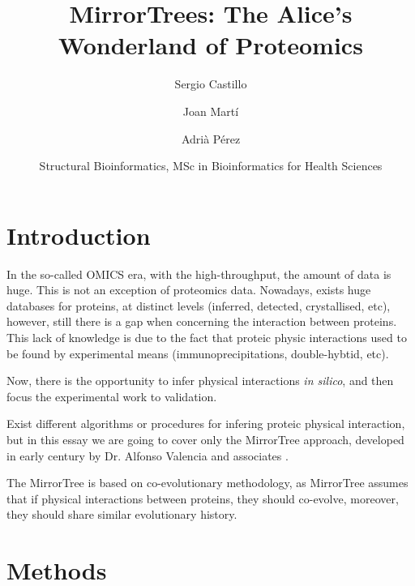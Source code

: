 \documentclass[11pt]{article}
\title{MirrorTrees: The Alice's Wonderland of Proteomics}
\author{
	Sergio Castillo
	\and
	Joan Martí
	\and
	Adrià Pérez
}
\date{Structural Bioinformatics, MSc in Bioinformatics for Health Sciences}
\begin{document}
\maketitle

\section{Introduction}
In the so-called OMICS era, with the high-throughput, the amount of data is huge. This is not an exception of proteomics data. Nowadays, exists huge databases for proteins, at distinct levels (inferred, detected, crystallised, etc), however, still there is a gap when concerning the interaction between proteins. This lack of knowledge is 	 due to the fact that proteic physic interactions used to be found by experimental means (immunoprecipitations, double-hybtid, etc).


Now, there is the opportunity to infer physical interactions \textit{in silico}, and then focus the experimental work to validation.

Exist different algorithms or procedures for infering proteic physical interaction, but in this essay we are going to cover only the MirrorTree approach, developed in early century by Dr. Alfonso Valencia and associates \cite{Pazos2001}.

The MirrorTree is based on co-evolutionary methodology, as MirrorTree assumes that if physical interactions between proteins, they should co-evolve, moreover, they should share similar evolutionary history.


\section{Methods}
\end{document}
